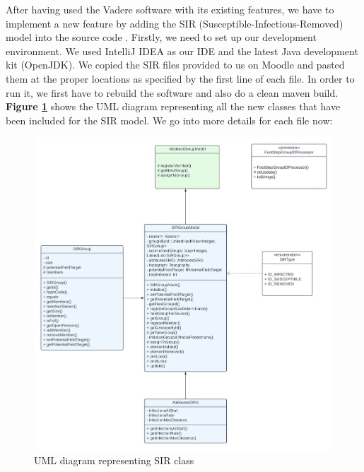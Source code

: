 
After having used the Vadere software with its existing features, we have to implement a new feature by adding the SIR (Susceptible-Infectious-Removed) model into the source code \cite{vadere-source}. Firstly, we need to set up our development environment. We used IntelliJ IDEA as our IDE and the latest Java development kit (OpenJDK). We copied the SIR files provided to us on Moodle and pasted them at the proper locations as specified by the first line of each file. In order to run it, we first have to rebuild the software and also do a clean maven build.
\textbf{Figure \ref{fig:UMLDiagram}} shows the UML diagram representing all the new classes that have been included for the SIR model. We go into more details for each file now:
\begin{figure}
  \includegraphics[width=\linewidth]{images/UML class.png}
  \caption{UML diagram representing SIR class}
  \label{fig:UMLDiagram}
\end{figure}
